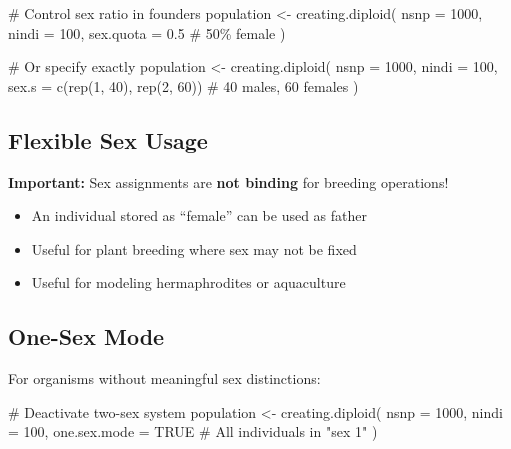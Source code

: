 \documentclass[
  letterpaper,
]{book}
\newenvironment{Shaded}{\begin{snugshade}}{\end{snugshade}}
\newcommand{\AttributeTok}[1]{\textcolor[rgb]{0.40,0.45,0.13}{#1}}
\newcommand{\CommentTok}[1]{\textcolor[rgb]{0.37,0.37,0.37}{#1}}
\newcommand{\ConstantTok}[1]{\textcolor[rgb]{0.56,0.35,0.01}{#1}}
\newcommand{\DecValTok}[1]{\textcolor[rgb]{0.68,0.00,0.00}{#1}}
\newcommand{\FloatTok}[1]{\textcolor[rgb]{0.68,0.00,0.00}{#1}}
\newcommand{\FunctionTok}[1]{\textcolor[rgb]{0.28,0.35,0.67}{#1}}
\newcommand{\NormalTok}[1]{\textcolor[rgb]{0.00,0.23,0.31}{#1}}
\newcommand{\OtherTok}[1]{\textcolor[rgb]{0.00,0.23,0.31}{#1}}
\providecommand{\tightlist}{%
  \setlength{\itemsep}{0pt}\setlength{\parskip}{0pt}}
\begin{document}
\begin{Shaded}
\begin{Highlighting}[]
\CommentTok{\# Control sex ratio in founders}
\NormalTok{population }\OtherTok{\textless{}{-}} \FunctionTok{creating.diploid}\NormalTok{(}
  \AttributeTok{nsnp =} \DecValTok{1000}\NormalTok{,}
  \AttributeTok{nindi =} \DecValTok{100}\NormalTok{,}
  \AttributeTok{sex.quota =} \FloatTok{0.5}  \CommentTok{\# 50\% female}
\NormalTok{)}

\CommentTok{\# Or specify exactly}
\NormalTok{population }\OtherTok{\textless{}{-}} \FunctionTok{creating.diploid}\NormalTok{(}
  \AttributeTok{nsnp =} \DecValTok{1000}\NormalTok{,}
  \AttributeTok{nindi =} \DecValTok{100}\NormalTok{,}
  \AttributeTok{sex.s =} \FunctionTok{c}\NormalTok{(}\FunctionTok{rep}\NormalTok{(}\DecValTok{1}\NormalTok{, }\DecValTok{40}\NormalTok{), }\FunctionTok{rep}\NormalTok{(}\DecValTok{2}\NormalTok{, }\DecValTok{60}\NormalTok{))  }\CommentTok{\# 40 males, 60 females}
\NormalTok{)}
\end{Highlighting}
\end{Shaded}

\subsection{Flexible Sex Usage}\label{flexible-sex-usage}

\textbf{Important:} Sex assignments are \textbf{not binding} for
breeding operations!

\begin{itemize}
\tightlist
\item
  An individual stored as ``female'' can be used as father
\item
  Useful for plant breeding where sex may not be fixed
\item
  Useful for modeling hermaphrodites or aquaculture
\end{itemize}

\subsection{One-Sex Mode}\label{one-sex-mode}

For organisms without meaningful sex distinctions:

\begin{Shaded}
\begin{Highlighting}[]
\CommentTok{\# Deactivate two{-}sex system}
\NormalTok{population }\OtherTok{\textless{}{-}} \FunctionTok{creating.diploid}\NormalTok{(}
  \AttributeTok{nsnp =} \DecValTok{1000}\NormalTok{,}
  \AttributeTok{nindi =} \DecValTok{100}\NormalTok{,}
  \AttributeTok{one.sex.mode =} \ConstantTok{TRUE}  \CommentTok{\# All individuals in "sex 1"}
\NormalTok{)}
\end{Highlighting}
\end{Shaded}
\end{document}
